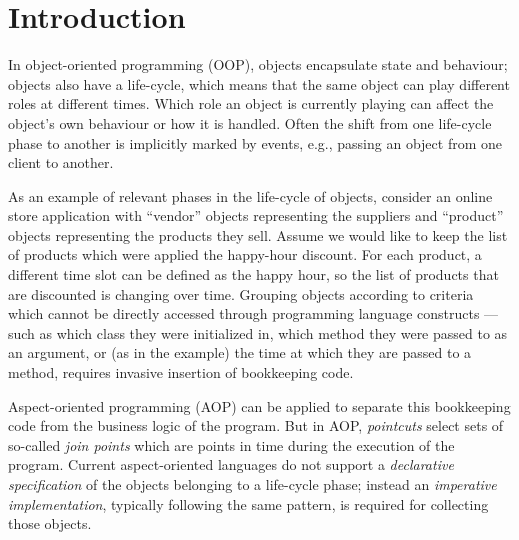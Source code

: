 
\section{Introduction}
In object-oriented programming (OOP), objects encapsulate state and behaviour; objects also have a life-cycle, which means that the same object can play different roles at different times.
Which role an object is currently playing can affect the object's own behaviour or how it is handled.
Often the shift from one life-cycle phase to another is implicitly marked by events, e.g., passing an object from one client to another.

As an example of relevant phases in the life-cycle of objects, consider an online store application with ``vendor'' objects representing the suppliers and ``product'' objects representing the products they sell. 
Assume we would like to keep the list of products which were applied the happy-hour discount. For each product, a different time slot can be defined as the happy hour, so the list of products that are discounted is changing over time. Grouping objects according to criteria which cannot be directly accessed through programming language constructs --- such as which class they were initialized in, which method they were passed to as an argument, or (as in the example) the time at which they are passed to a method, requires invasive insertion of bookkeeping code.

Aspect-oriented programming (AOP) can be applied to separate this bookkeeping code from the business logic of the program. But in AOP, \emph{pointcuts} select sets of so-called \emph{join points} which are points in time during the execution of the program. Current aspect-oriented languages do not support a \emph{declarative specification} of the objects belonging to a life-cycle phase; instead an \emph{imperative implementation}, typically following the same pattern, is required for collecting those objects.

